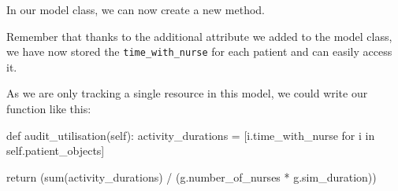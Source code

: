 \documentclass[
  letterpaper,
  DIV=11,
  numbers=noendperiod]{scrreprt}
\newenvironment{Shaded}{\begin{snugshade}}{\end{snugshade}}
\newcommand{\BuiltInTok}[1]{\textcolor[rgb]{0.00,0.23,0.31}{#1}}
\newcommand{\ControlFlowTok}[1]{\textcolor[rgb]{0.00,0.23,0.31}{#1}}
\newcommand{\KeywordTok}[1]{\textcolor[rgb]{0.00,0.23,0.31}{#1}}
\newcommand{\NormalTok}[1]{\textcolor[rgb]{0.00,0.23,0.31}{#1}}
\newcommand{\OperatorTok}[1]{\textcolor[rgb]{0.37,0.37,0.37}{#1}}
\newcommand{\VariableTok}[1]{\textcolor[rgb]{0.07,0.07,0.07}{#1}}
\begin{document}
In our model class, we can now create a new method.

Remember that thanks to the additional attribute we added to the model
class, we have now stored the \texttt{time\_with\_nurse} for each
patient and can easily access it.

As we are only tracking a single resource in this model, we could write
our function like this:

\begin{Shaded}
\begin{Highlighting}[]
\KeywordTok{def}\NormalTok{ audit\_utilisation(}\VariableTok{self}\NormalTok{):}
\NormalTok{    activity\_durations }\OperatorTok{=}\NormalTok{ [i.time\_with\_nurse }\ControlFlowTok{for}\NormalTok{ i }\KeywordTok{in} \VariableTok{self}\NormalTok{.patient\_objects]}

    \ControlFlowTok{return}\NormalTok{ (}\BuiltInTok{sum}\NormalTok{(activity\_durations) }\OperatorTok{/}\NormalTok{ (g.number\_of\_nurses }\OperatorTok{*}\NormalTok{ g.sim\_duration))}
\end{Highlighting}
\end{Shaded}
\end{document}
